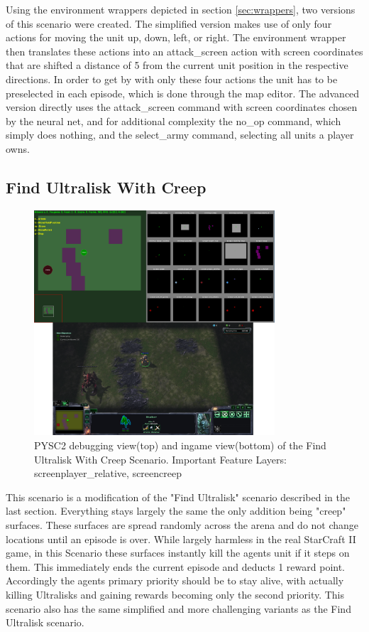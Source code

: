 Using the environment wrappers depicted in section \ref{sec:wrappers}, two versions of this scenario were created. The simplified version makes use of only four actions for moving the unit up, down, left, or right. The environment wrapper then translates these actions into an attack\_screen action with screen coordinates that are shifted a distance of 5 from the current unit position in the respective directions.
In order to get by with only these four actions the unit has to be preselected in each episode, which is done through the map editor.
The advanced version directly uses the attack\_screen command with screen coordinates chosen by the neural net, and for additional complexity the no\_op command, which simply does nothing, and the select\_army command, selecting all units a player owns.

\subsection{Find Ultralisk With Creep} 
\begin{figure}[htb]
  \centering
      \includegraphics[width=0.8\textwidth]{Figures/FindUltraliskWithCreep.png}
  \caption{PYSC2 debugging view(top) and ingame view(bottom) of the Find Ultralisk With Creep Scenario. Important Feature Layers: screenplayer\_relative, screencreep }
\end{figure}

This scenario is a modification of the "Find Ultralisk" scenario described in the last section. Everything stays largely the same the only addition being "creep" surfaces. These surfaces are spread randomly across the arena and do not change locations until an episode is over. While largely harmless in the real StarCraft II game, in this Scenario these surfaces instantly kill the agents unit if it steps on them. This immediately ends the current episode and deducts 1 reward point. Accordingly the agents primary priority should be to stay alive, with actually killing Ultralisks and gaining rewards becoming only the second priority. This scenario also has the same simplified and more challenging variants as the Find Ultralisk scenario.


